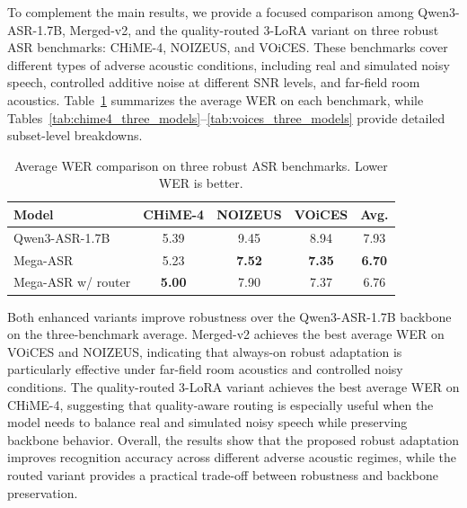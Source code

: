 \documentclass{llmxive}
\begin{document}
To complement the main results, we provide a focused comparison among
Qwen3-ASR-1.7B, Merged-v2, and the quality-routed 3-LoRA variant on three robust
ASR benchmarks: CHiME-4, NOIZEUS, and VOiCES. These benchmarks cover different
types of adverse acoustic conditions, including real and simulated noisy speech,
controlled additive noise at different SNR levels, and far-field room acoustics.
Table~\ref{tab:robust_three_dataset_summary} summarizes the average WER on each
benchmark, while Tables~\ref{tab:chime4_three_models}--\ref{tab:voices_three_models}
provide detailed subset-level breakdowns.

\begin{table}[t]
\centering
\small
\vspace{-1mm}
\label{tab:robust_three_dataset_summary}
\begin{tabular}{lcccc}
\toprule
\textbf{Model}
& \textbf{CHiME-4}
& \textbf{NOIZEUS}
& \textbf{VOiCES}
& \textbf{Avg.} \\
\midrule
Qwen3-ASR-1.7B
& 5.39 & 9.45 & 8.94 & 7.93 \\

Mega-ASR
& 5.23 & \textbf{7.52} & \textbf{7.35} & \textbf{6.70} \\

Mega-ASR w/ router
& \textbf{5.00} & 7.90 & 7.37 & 6.76 \\
\bottomrule
\end{tabular}
\vspace{-2mm}
\caption{
Average WER comparison on three robust ASR benchmarks. Lower WER is better.
}
\end{table}

Both enhanced variants improve robustness over the Qwen3-ASR-1.7B backbone on
the three-benchmark average. Merged-v2 achieves the best average WER on VOiCES
and NOIZEUS, indicating that always-on robust adaptation is particularly
effective under far-field room acoustics and controlled noisy conditions.
The quality-routed 3-LoRA variant achieves the best average WER on CHiME-4,
suggesting that quality-aware routing is especially useful when the model needs
to balance real and simulated noisy speech while preserving backbone behavior.
Overall, the results show that the proposed robust adaptation improves
recognition accuracy across different adverse acoustic regimes, while the routed
variant provides a practical trade-off between robustness and backbone
preservation.
\end{document}
